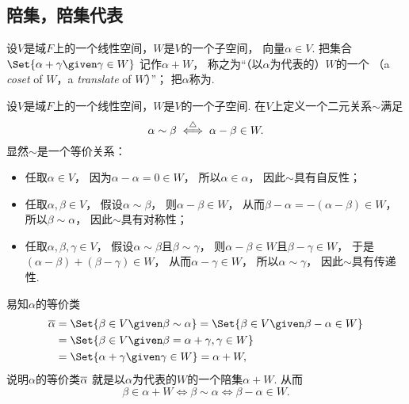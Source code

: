 \subsection{陪集，陪集代表}
\begin{definition}
设\(V\)是域\(F\)上的一个线性空间，\(W\)是\(V\)的一个子空间，
向量\(\alpha \in V\).
把集合\(\Set{ \alpha + \gamma \given \gamma \in W }\)
记作\(\alpha+W\)，
称之为“（以\(\alpha\)为代表的）\(W\)的一个%
（a \emph{coset} of \(W\)，a \emph{translate} of \(W\)）”；
把\(\alpha\)称为.
\end{definition}

设\(V\)是域\(F\)上的一个线性空间，\(W\)是\(V\)的一个子空间.
在\(V\)上定义一个二元关系\(\sim\)满足\begin{equation*}
	\alpha\sim\beta
	\overset{\triangle}{\iff}
	\alpha-\beta\in W.
\end{equation*}
显然\(\sim\)是一个等价关系：\begin{itemize}
	\item 任取\(\alpha \in V\)，
	因为\(\alpha - \alpha = 0 \in W\)，
	所以\(\alpha \in \alpha\)，
	因此\(\sim\)具有自反性；
	\item 任取\(\alpha,\beta \in V\)，
	假设\(\alpha \sim \beta\)，
	则\(\alpha - \beta \in W\)，
	从而\(\beta - \alpha = - (\alpha - \beta) \in W\)，
	所以\(\beta \sim \alpha\)，
	因此\(\sim\)具有对称性；
	\item 任取\(\alpha,\beta,\gamma \in V\)，
	假设\(\alpha \sim \beta\)且\(\beta \sim \gamma\)，
	则\(\alpha - \beta \in W\)且\(\beta - \gamma \in W\)，
	于是\(
		(\alpha - \beta)	\allowbreak
		+					\allowbreak
		(\beta - \gamma)	\allowbreak
		\in W
	\)，
	从而\(\alpha - \gamma \in W\)，
	所以\(\alpha \sim \gamma\)，
	因此\(\sim\)具有传递性.
\end{itemize}
易知\(\alpha\)的等价类\begin{align*}
	\EquivalenceClassO{\alpha}
	&= \Set{ \beta \in V \given \beta \sim \alpha }
	= \Set{ \beta \in V \given \beta - \alpha \in W } \\
	&= \Set{ \beta \in V \given \beta = \alpha + \gamma, \gamma \in W } \\
	&= \Set{ \alpha+\gamma \given \gamma \in W }
	= \alpha+W,
\end{align*}
说明\(\alpha\)的等价类\(\EquivalenceClassO{\alpha}\)
就是以\(\alpha\)为代表的\(W\)的一个陪集\(\alpha+W\).
从而\begin{equation*}
	\beta \in \alpha + W
	\iff
	\beta \sim \alpha
	\iff
	\beta - \alpha \in W.
\end{equation*}

